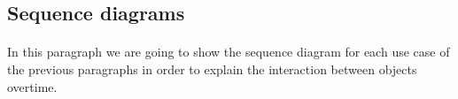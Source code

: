 \pagebreak
\subsection{Sequence diagrams}

\paragraph{ } In this paragraph we are going to show the sequence diagram for each use case of the previous paragraphs in order to explain the interaction between objects overtime.
